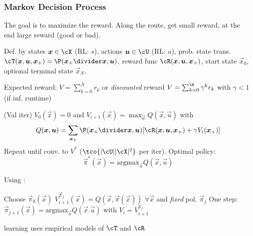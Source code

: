 \subsubsection{Markov Decision Process}
The goal is to maximize the reward. Along the route, get small reward,
at the end large reward (good or bad).

Def. by states $\vec{x} \in \cX$ (RL: $s$), actions $\vec{u} \in \cU$ (RL: $a$), prob. state trans. $\cT(\vec{x}, \vec{u}, \vec{x}_+) = \P(\vec{x}_+ \divider \vec{x}, \vec{u})$,
reward func $\cR(\vec{x}, \vec{u}, \vec{x}_+)$, start state $\vec{x}_0$, optional terminal state $\vec{x}_N$.

 Expected reward: $V = \sum_{k = 0}^{N} r_k$ or \textit{discounted} reward  $V = \sum_{k = 0}^{\8} \gamma^k r_k$ with $\gamma < 1$ (if inf. runtime)

 (Val iter) $V_0(\vec{x}) = 0$ and $V_{i + 1}(\vec{x}) = \max_{\vec{u}} Q(\vec{x}, \vec{u})$ with
\[
    Q(\vec{x}, \vec{u}) = \sum_{\vec{x}_+} \P(\vec{x}_+ \divider \vec{x}, \vec{u}) [\cR(\vec{x}, \vec{u}, \vec{x}_+) + \gamma V_i(\vec{x}_+)]
\]
Repeat until conv. to $V^*$ ($\tco{|\cU||\cX|^2}$ per iter). Optimal policy:
\[
    \vec{\pi}^*(\vec{x}) = \text{argmax}_{\vec{u}} Q(\vec{x}, \vec{u})
\]

Using :
\begin{algorithm}
    \begin{algorithmic}[1]
        \State Choose $\vec{\pi}_0(\vec{x})$
            \Repeat $V_{i + 1}^{\vec{\pi}_j}(\vec{x}) = Q(\vec{x}, \vec{\pi}(\vec{x}))$ $\forall \vec{x}$ and \textit{fixed} pol. $\vec{\pi}_j$
        \EndWhile
        \State One step: $\vec{\pi}_{j + 1}(\vec{x}) = \text{argmax}_{\vec{u}} Q(\vec{x}. \vec{u})$ with $V_i = V_{i + 1}^{\pi_j}$
    \end{algorithmic}
\end{algorithm}

 learning uses empirical models of $\cT$ and $\cR$
